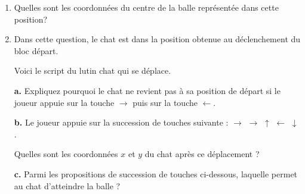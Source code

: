 \begin{enumerate}
\item Quelles sont les coordonnées du centre de la balle représentée dans cette position?
\item Dans cette question, le chat est dans la position obtenue au déclenchement du bloc
départ.

Voici le script du lutin \og chat \fg{} qui se déplace.

\parbox{0.43\linewidth}{\textbf{a.} Expliquez pourquoi le chat ne revient pas à sa position
de départ si le joueur appuie sur la touche $\to$ puis sur la touche $\gets$.

\textbf{b.} Le joueur appuie sur la succession de touches
suivante : $\to$ $\to$  $\uparrow$ $\gets$ $\downarrow$.

Quelles sont les coordonnées $x$ et $y$ du chat après ce déplacement ?

\textbf{c.} Parmi les propositions de succession de touches ci-dessous, laquelle permet au
chat d'atteindre la balle ?} \hfill 
\parbox{0.51\linewidth}{\scriptsize \begin{scratch}
\end{scratch}

\begin{scratch}
\end{scratch}
\begin{scratch}
\end{scratch}

\medskip

\begin{scratch}
\end{scratch}
\begin{scratch}
\end{scratch}

\medskip

\begin{scratch}
{
{
}
{}
}
\end{scratch}
}


\end{enumerate}
